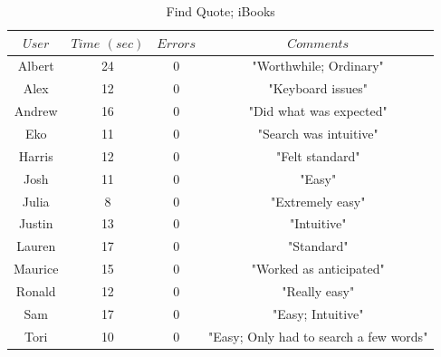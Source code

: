 \documentclass[11pt, oneside]{article}
\begin{document}
\begin{table}[!hbt]
\begin{center}
\caption{Find Quote; iBooks}
\label{tab:task3learnKindle}
\begin{tabular}{|c|c|c|c|}
\hline
$User$ & $Time$ $(sec)$ & $Errors$ & $Comments$\\
\hline
Albert & 24 & 0 & "Worthwhile; Ordinary"\\
\hline
Alex & 12 & 0 & "Keyboard issues"\\
\hline
Andrew & 16 & 0 & "Did what was expected"\\
\hline
Eko & 11 & 0 & "Search was intuitive"\\
\hline
Harris & 12 & 0 & "Felt standard"\\
\hline
Josh & 11 & 0 & "Easy"\\
\hline
Julia & 8 & 0 & "Extremely easy"\\
\hline
Justin & 13 & 0 & "Intuitive"\\
\hline
Lauren & 17 & 0 & "Standard"\\
\hline
Maurice & 15 & 0 & "Worked as anticipated"\\
\hline
Ronald & 12 & 0 & "Really easy"\\
\hline
Sam & 17 & 0 & "Easy; Intuitive"\\
\hline
Tori & 10 & 0 & "Easy; Only had to search a few words"\\
\hline
\end{tabular}
\end{center}
\end{table}
\end{document}
